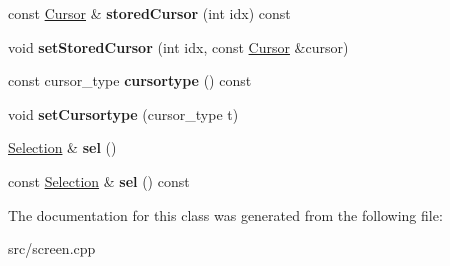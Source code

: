 \begin{DoxyCompactItemize}
const \mbox{\hyperlink{structscreen_1_1Cursor}{Cursor}} \& {\bfseries stored\+Cursor} (int idx) const
\item 
\mbox{\label{classscreen_1_1ScreenImpl_a4ee647038e5cb560fbf3bba64f323840}} 
void {\bfseries set\+Stored\+Cursor} (int idx, const \mbox{\hyperlink{structscreen_1_1Cursor}{Cursor}} \&cursor)
\item 
\mbox{\label{classscreen_1_1ScreenImpl_ab35fec1eb10bce0553936058bc7bd475}} 
const cursor\+\_\+type {\bfseries cursortype} () const
\item 
\mbox{\label{classscreen_1_1ScreenImpl_ae3f379c705d6ee32c4dd81ec518c8793}} 
void {\bfseries set\+Cursortype} (cursor\+\_\+type t)
\item 
\mbox{\label{classscreen_1_1ScreenImpl_a5dcedc2802f9c05b73dfcc82a46cc3ce}} 
\mbox{\hyperlink{classSelection}{Selection}} \& {\bfseries sel} ()
\item 
\mbox{\label{classscreen_1_1ScreenImpl_a529061deae92d9d247be7dd3f7db832e}} 
const \mbox{\hyperlink{classSelection}{Selection}} \& {\bfseries sel} () const
\end{DoxyCompactItemize}


The documentation for this class was generated from the following file\+:\begin{DoxyCompactItemize}
\item 
src/screen.\+cpp\end{DoxyCompactItemize}
